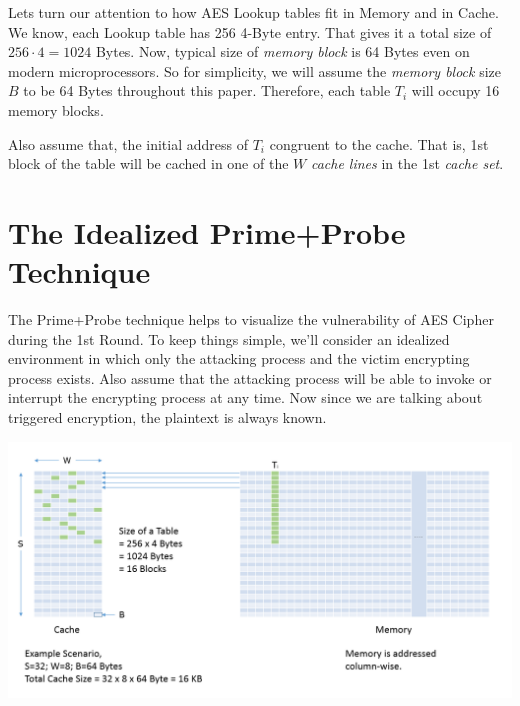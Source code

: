 \documentclass[3p]{elsarticle}
\begin{document}
Lets turn our attention to how AES Lookup tables fit in Memory and in Cache. We know, each Lookup table has 256 4-Byte entry. That gives it a total size of $256 \cdot 4=1024$ Bytes. Now, typical size of \emph{memory block} is 64 Bytes even on modern microprocessors. So for simplicity, we will assume the \emph{memory block} size $B$ to be 64 Bytes throughout this paper. Therefore, each table $T_i$ will occupy 16 memory blocks.

\begin{flushleft}
Also assume that, the initial address of $T_i$ congruent to the cache. That is, 1st block of the table will be cached in one of the $W$ \emph{cache lines} in the 1st \emph{cache set}.
\end{flushleft}

\section{The Idealized Prime+Probe Technique}

The Prime+Probe technique helps to visualize the vulnerability of AES Cipher during the 1st Round. To keep things simple, we'll consider an idealized environment in which only the attacking process and the victim encrypting process exists. Also assume that the attacking process will be able to invoke or interrupt the encrypting process at any time. Now since we are talking about triggered encryption, the plaintext is always known.

\begin{center}
\includegraphics[scale=0.4,natwidth=1159,natheight=589]{Figures/lookup(new).png}
\label{fig: Demonstration of how AES Lookup Table fits in memory and cache.}
\end{center}
\end{document}
